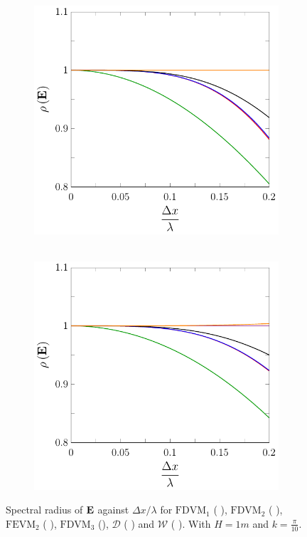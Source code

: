 \begin{figure}
	\centering
	\begin{subfigure}{0.5\textwidth}
		\includegraphics[width=\textwidth]{./chp4/figures/New/Stabu0.pdf}\
	\end{subfigure}%
	\begin{subfigure}{0.5\textwidth}
		\includegraphics[width=\textwidth]{./chp4/figures/New/Stabu1.pdf}
	\end{subfigure}
	\caption{Spectral radius of $\mathbf{E}$ against $\Delta x / \lambda$ for $\text{FDVM}_1$ ({\color{green!60!black} \solidrule}), $\text{FDVM}_2$ ({\color{red} \solidrule}), $\text{FEVM}_2$ ({\color{blue} \solidrule}), $\text{FDVM}_3$ ({\solidrule}), $\mathcal{D}$ ({\color{violet!80!white} \solidrule}) and $\mathcal{W}$ ({\color{orange} \solidrule}). With $H = 1m$ and $k = \frac{\pi}{10}$.}
	\label{fig:StabShall}
\end{figure}

